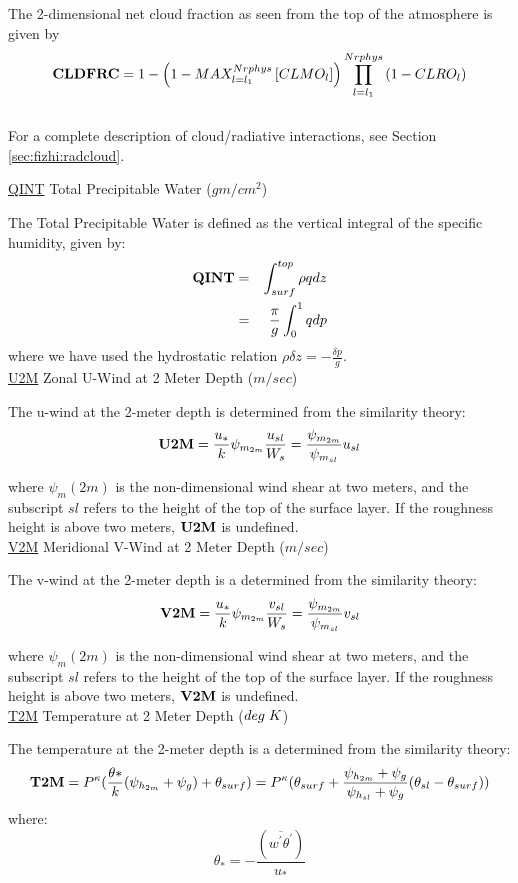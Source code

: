 \noindent
The 2-dimensional net cloud fraction as seen from the top of the
atmosphere is given by
\[
{\bf CLDFRC} = 1-\left( 1-MAX_{l=l_1}^{Nrphys} \left[ CLMO_l \right] \right)
    \prod_{l=l_1}^{Nrphys} \left( 1-CLRO_l \right)
\]
\\
For a complete description of cloud/radiative interactions, see Section \ref{sec:fizhi:radcloud}.


\noindent
{ \underline {QINT} Total Precipitable Water ($gm/cm^2$) }

\noindent
The Total Precipitable Water is defined as the vertical integral of the specific humidity,
given by:
\begin{eqnarray*}
{\bf QINT} & = & \int_{surf}^{top} \rho q dz \\
           & = & \frac{\pi}{g} \int_0^1 q dp
\end{eqnarray*}
where we have used the hydrostatic relation 
$\rho \delta z = -\frac{\delta p}{g} $.
\\


\noindent
{ \underline {U2M}  Zonal U-Wind at 2 Meter Depth ($m/sec$) }

\noindent
The u-wind at the 2-meter depth is determined from the similarity theory:
\[
{\bf U2M} = \frac{u_*}{k} \psi_{m_{2m}} \frac{u_{sl}}{W_s} =
\frac{ \psi_{m_{2m}} }{ \psi_{m_{sl}} }u_{sl}
\]

\noindent
where $\psi_m(2m)$ is the non-dimensional wind shear at two meters, and the subscript
$sl$ refers to the height of the top of the surface layer. If the roughness height
is above two meters, ${\bf U2M}$ is undefined.
\\
 
\noindent
{ \underline {V2M}  Meridional V-Wind at 2 Meter Depth ($m/sec$) }

\noindent
The v-wind at the 2-meter depth is a determined from the similarity theory:
\[
{\bf V2M} = \frac{u_*}{k} \psi_{m_{2m}} \frac{v_{sl}}{W_s} =
\frac{ \psi_{m_{2m}} }{ \psi_{m_{sl}} }v_{sl}
\]

\noindent
where $\psi_m(2m)$ is the non-dimensional wind shear at two meters, and the subscript
$sl$ refers to the height of the top of the surface layer. If the roughness height
is above two meters, ${\bf V2M}$ is undefined.
\\
 
\noindent
{ \underline {T2M}  Temperature at 2 Meter Depth ($deg \hspace{.1cm} K$) }

\noindent
The temperature at the 2-meter depth is a determined from the similarity theory:
\[
{\bf T2M} = P^{\kappa} (\frac{\theta*}{k} ({\psi_{h_{2m}}+\psi_g}) + \theta_{surf} ) = 
P^{\kappa}(\theta_{surf} + \frac{ \psi_{h_{2m}}+\psi_g }{ \psi_{h_{sl}}+\psi_g }
(\theta_{sl} - \theta_{surf}) ) 
\]
where:
\[
\theta_* = - \frac{ (\overline{w^{\prime}\theta^{\prime}}) }{ u_* }
\]

